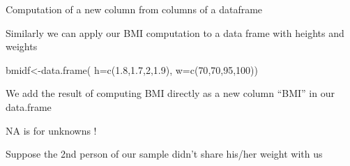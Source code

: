 \documentclass[
  letterpaper,
  DIV=11,
  numbers=noendperiod]{scrreprt}
\newenvironment{Shaded}{\begin{snugshade}}{\end{snugshade}}
\newcommand{\AttributeTok}[1]{\textcolor[rgb]{0.40,0.45,0.13}{#1}}
\newcommand{\CommentTok}[1]{\textcolor[rgb]{0.37,0.37,0.37}{#1}}
\newcommand{\DecValTok}[1]{\textcolor[rgb]{0.68,0.00,0.00}{#1}}
\newcommand{\FloatTok}[1]{\textcolor[rgb]{0.68,0.00,0.00}{#1}}
\newcommand{\FunctionTok}[1]{\textcolor[rgb]{0.28,0.35,0.67}{#1}}
\newcommand{\NormalTok}[1]{\textcolor[rgb]{0.00,0.23,0.31}{#1}}
\newcommand{\OtherTok}[1]{\textcolor[rgb]{0.00,0.23,0.31}{#1}}
\newcommand{\SpecialCharTok}[1]{\textcolor[rgb]{0.37,0.37,0.37}{#1}}
\begin{document}
Computation of a new column from columns of a dataframe

\begin{Shaded}
\end{Shaded}

Similarly we can apply our BMI computation to a data frame with heights
and weights

\begin{Shaded}
\begin{Highlighting}[]
\NormalTok{bmidf}\OtherTok{\textless{}{-}}\FunctionTok{data.frame}\NormalTok{(}
  \AttributeTok{h=}\FunctionTok{c}\NormalTok{(}\FloatTok{1.8}\NormalTok{,}\FloatTok{1.7}\NormalTok{,}\DecValTok{2}\NormalTok{,}\FloatTok{1.9}\NormalTok{),}
  \AttributeTok{w=}\FunctionTok{c}\NormalTok{(}\DecValTok{70}\NormalTok{,}\DecValTok{70}\NormalTok{,}\DecValTok{95}\NormalTok{,}\DecValTok{100}\NormalTok{))}
\end{Highlighting}
\end{Shaded}

We add the result of computing BMI directly as a new column ``BMI'' in
our data.frame

\begin{Shaded}
\end{Shaded}

NA is for unknowns !

Suppose the 2nd person of our sample didn't share his/her weight with us
\end{document}
